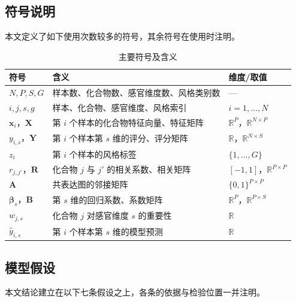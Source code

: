 ﻿\documentclass[UTF8,a4paper,zihao=-4]{ctexart}
\numberwithin{figure}{section}
\numberwithin{table}{section}
\numberwithin{equation}{section}
\newcommand{\R}{\mathbb{R}}
\newcommand{\vx}{\bm{x}}
\newcommand{\bX}{\bm{X}}
\newcommand{\bY}{\bm{Y}}
\newcommand{\bA}{\bm{A}}
\newcommand{\bR}{\bm{R}}
\newcommand{\bB}{\bm{B}}
\newcommand{\bbeta}{\bm{\beta}}
\begin{document}
\subsection{符号说明}

本文定义了如下使用次数较多的符号，其余符号在使用时注明。
\begin{table}[H]
  \centering
  \caption{主要符号及含义}
  \label{tab:notation}
  \small
  \begin{tabularx}{\textwidth}{@{}l X l@{}}
    \toprule
    符号 & 含义 & 维度/取值 \\
    \midrule
    $N,P,S,G$ & 样本数、化合物数、感官维度数、风格类别数 & — \\
    $i,j,s,g$ & 样本、化合物、感官维度、风格索引 & $i=1,\dots,N$ \\
    $\vx_i$，$\bX$ & 第 $i$ 个样本的化合物特征向量、特征矩阵 & $\R^{P}$，$\R^{N\times P}$ \\
    $y_{i,s}$，$\bY$ & 第 $i$ 个样本第 $s$ 维的评分、评分矩阵 & $\R$，$\R^{N\times S}$ \\
    $z_i$ & 第 $i$ 个样本的风格标签 & $\{1,\dots,G\}$ \\
    $r_{j,j'}$，$\bR$ & 化合物 $j$ 与 $j'$ 的相关系数、相关矩阵 & $[-1,1]$，$\R^{P\times P}$ \\
    $\bA$ & 共表达图的邻接矩阵 & $\{0,1\}^{P\times P}$ \\
    $\bbeta_s$，$\bB$ & 第 $s$ 维的回归系数、系数矩阵 & $\R^{P}$，$\R^{P\times S}$ \\
    $w_{j,s}$ & 化合物 $j$ 对感官维度 $s$ 的重要性 & $\R$ \\
    $\hat{y}_{i,s}$ & 第 $i$ 个样本第 $s$ 维的模型预测 & $\R$ \\
    \bottomrule
  \end{tabularx}
\end{table}

\subsection{模型假设}

本文结论建立在以下七条假设之上，各条的依据与检验位置一并注明。
\end{document}
